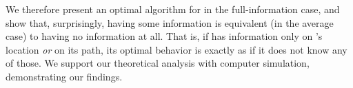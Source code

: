 We therefore present an optimal algorithm for \opp in the full-information case, and show that, surprisingly, having some information is equivalent (in the average case) to having no information at all. That is, if \rob has information only on \opp's location {\em or} on its path, its optimal behavior is exactly as if it does not know any of those. We support our theoretical analysis with computer simulation, demonstrating our findings. 